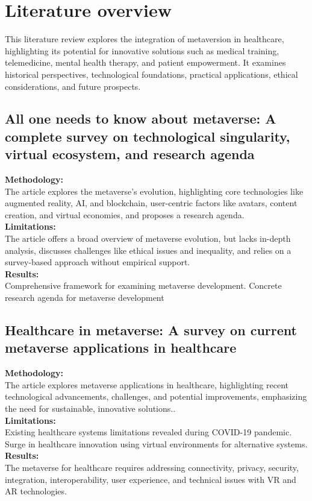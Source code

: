 \chapter{Literature overview}
\label{ch:lit-review}
This literature review explores the integration of metaversion in healthcare, highlighting its potential for innovative solutions such as medical training, telemedicine, mental health therapy, and patient empowerment. It examines historical perspectives, technological foundations, practical applications, ethical considerations, and future prospects.
\section{All one needs to know about metaverse: A complete survey on technological singularity, virtual ecosystem, and research agenda \cite{lee2021all}\cite{BookChapter1}}
\textbf{Methodology:}\\The article explores the metaverse's evolution, highlighting core technologies like augmented reality, AI, and blockchain, user-centric factors like avatars, content creation, and virtual economies, and proposes a research agenda. \\
\textbf{Limitations:}\\The article offers a broad overview of metaverse evolution, but lacks in-depth analysis, discusses challenges like ethical issues and inequality, and relies on a survey-based approach without empirical support. \\
\textbf{Results:}\\Comprehensive framework for examining metaverse development.
Concrete research agenda for metaverse development
\section{Healthcare in metaverse: A survey on current metaverse applications in healthcare\cite{bansal2022healthcare}\cite{JournalArticle12}}
\textbf{Methodology:}\\
The article explores metaverse applications in healthcare, highlighting recent technological advancements, challenges, and potential improvements, emphasizing the need for sustainable, innovative solutions..\\
\textbf{Limitations:}\\Existing healthcare systems limitations revealed during COVID-19 pandemic. Surge in healthcare innovation using virtual environments for alternative systems. \\
\textbf{Results:}\\The metaverse for healthcare requires addressing connectivity, privacy, security, integration, interoperability, user experience, and technical issues with VR and AR technologies.
